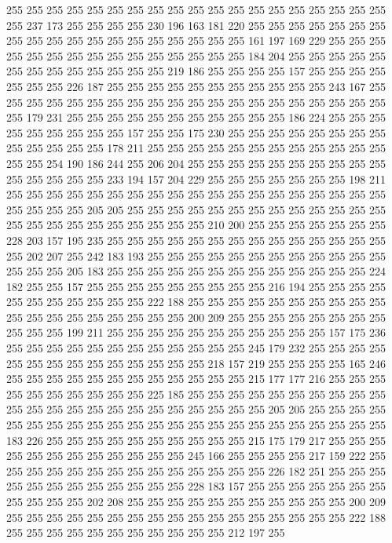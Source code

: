255 255 255 255 255 255 255 255 255 255 255 255 255 255 255 255 255 255 255 255
237 173 255 255 255 255 230 196 163 181 220 255 255 255 255 255 255 255 255 255
255 255 255 255 255 255 255 255 255 255 161 197 169 229 255 255 255 255 255 255
255 255 255 255 255 255 255 255 255 184 204 255 255 255 255 255 255 255 255 255
255 255 255 255 219 186 255 255 255 255 157 255 255 255 255 255 255 255 226 187
255 255 255 255 255 255 255 255 255 255 255 243 167 255 255 255 255 255 255 255
255 255 255 255 255 255 255 255 255 255 255 255 255 255 179 231 255 255 255 255
255 255 255 255 255 255 255 186 224 255 255 255 255 255 255 255 255 255 157 255
255 175 230 255 255 255 255 255 255 255 255 255 255 255 255 255 178 211 255 255
255 255 255 255 255 255 255 255 255 255 255 255 254 190 186 244 255 206 204 255
255 255 255 255 255 255 255 255 255 255 255 255 255 255 233 194 157 204 229 255
255 255 255 255 255 255 198 211 255 255 255 255 255 255 255 255 255 255 255 255
255 255 255 255 255 255 255 255 255 255 255 205 205 255 255 255 255 255 255 255
255 255 255 255 255 255 255 255 255 255 255 255 255 255 255 255 210 200 255 255
255 255 255 255 255 228 203 157 195 235 255 255 255 255 255 255 255 255 255 255
255 255 255 255 255 202 207 255 242 183 193 255 255 255 255 255 255 255 255 255
255 255 255 255 255 255 205 183 255 255 255 255 255 255 255 255 255 255 255 255
255 224 182 255 255 157 255 255 255 255 255 255 255 255 255 216 194 255 255 255
255 255 255 255 255 255 255 255 222 188 255 255 255 255 255 255 255 255 255 255
255 255 255 255 255 255 255 255 255 200 209 255 255 255 255 255 255 255 255 255
255 255 199 211 255 255 255 255 255 255 255 255 255 255 255 157 175 236 255 255
255 255 255 255 255 255 255 255 255 255 245 179 232 255 255 255 255 255 255 255
255 255 255 255 255 255 255 218 157 219 255 255 255 255 165 246 255 255 255 255
255 255 255 255 255 255 255 255 215 177 177 216 255 255 255 255 255 255 255 255
255 255 225 185 255 255 255 255 255 255 255 255 255 255 255 255 255 255 255 255
255 255 255 255 255 255 255 205 205 255 255 255 255 255 255 255 255 255 255 255
255 255 255 255 255 255 255 255 255 255 255 255 183 226 255 255 255 255 255 255
255 255 255 255 215 175 179 217 255 255 255 255 255 255 255 255 255 255 255 255
245 166 255 255 255 255 217 159 222 255 255 255 255 255 255 255 255 255 255 255
255 255 255 226 182 251 255 255 255 255 255 255 255 255 255 255 255 255 228 183
157 255 255 255 255 255 255 255 255 255 255 255 202 208 255 255 255 255 255 255
255 255 255 255 255 200 209 255 255 255 255 255 255 255 255 255 255 255 255 255
255 255 255 255 222 188 255 255 255 255 255 255 255 255 255 255 255 212 197 255
